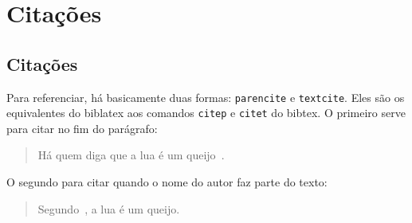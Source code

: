 
\chapter{Citações}
\section{Citações}

Para referenciar, há basicamente duas formas: \texttt{parencite} e
\texttt{textcite}. Eles são os equivalentes do biblatex aos comandos
\texttt{citep} e \texttt{citet} do bibtex. O primeiro serve para citar no fim do
parágrafo:

\begin{quote}
  Há quem diga que a lua é um queijo~\parencite{book:ogata}.
\end{quote}

O segundo para citar quando o nome do autor faz parte do texto:

\begin{quote}
  Segundo~\textcite{book:ogata}, a lua é um queijo.
\end{quote}
